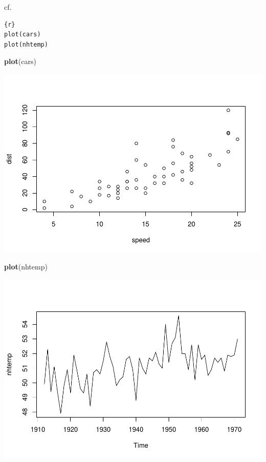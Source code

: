 \documentclass[
]{book}
\newenvironment{Shaded}{\begin{snugshade}}{\end{snugshade}}
\newcommand{\FunctionTok}[1]{\textcolor[rgb]{0.13,0.29,0.53}{\textbf{#1}}}
\newcommand{\NormalTok}[1]{#1}
\theoremstyle{definition}
\theoremstyle{definition}
\theoremstyle{definition}
\theoremstyle{definition}
\theoremstyle{remark}
\begin{document}
cf.

\begin{verbatim}
{r}
plot(cars)
plot(nhtemp)
\end{verbatim}

\begin{Shaded}
\begin{Highlighting}[]
\FunctionTok{plot}\NormalTok{(cars)}
\end{Highlighting}
\end{Shaded}

\includegraphics{202401280001-test_files/figure-latex/unnamed-chunk-5-1.pdf}

\begin{Shaded}
\begin{Highlighting}[]
\FunctionTok{plot}\NormalTok{(nhtemp)}
\end{Highlighting}
\end{Shaded}

\includegraphics{202401280001-test_files/figure-latex/unnamed-chunk-5-2.pdf}
\end{document}
